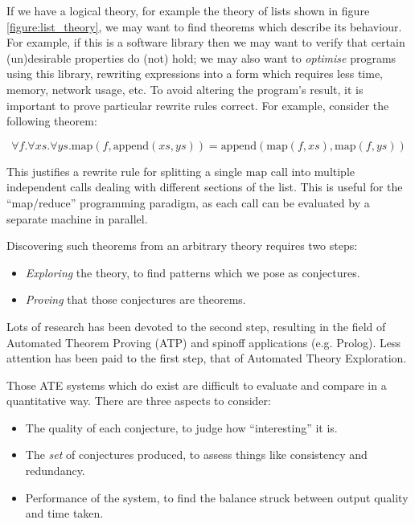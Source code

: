 If we have a logical theory, for example the theory of lists shown in figure
\ref{figure:list_theory}, we may want to find theorems which describe its
behaviour. For example, if this is a software library then we may want to verify
that certain (un)desirable properties do (not) hold; we may also want to
\emph{optimise} programs using this library, rewriting expressions into a form
which requires less time, memory, network usage, etc. To avoid altering the
program's result, it is important to prove particular rewrite rules correct. For
example, consider the following theorem:

\begin{equation} \label{eq:mapreduce}
  \forall f. \forall xs. \forall ys. \text{map}(f, \text{append}(xs, ys)) = \text{append}(\text{map}(f, xs), \text{map}(f, ys))
\end{equation}

This justifies a rewrite rule for splitting a single $\text{map}$ call into
multiple independent calls dealing with different sections of the list. This is
useful for the ``map/reduce'' programming paradigm, as each call can be
evaluated by a separate machine in parallel.

Discovering such theorems from an arbitrary theory requires two steps:

\begin{itemize}
\item \emph{Exploring} the theory, to find patterns which we pose as
  conjectures.
\item \emph{Proving} that those conjectures are theorems.
\end{itemize}

Lots of research has been devoted to the second step, resulting in the field of
Automated Theorem Proving (ATP) and spinoff applications (e.g. Prolog). Less
attention has been paid to the first step, that of Automated Theory Exploration.

Those ATE systems which do exist are difficult to evaluate and compare in a
quantitative way. There are three aspects to consider:

\begin{itemize}
\item The quality of each conjecture, to judge how ``interesting'' it is.
\item The \emph{set} of conjectures produced, to assess things like consistency
  and redundancy.
\item Performance of the system, to find the balance struck between output
  quality and time taken.
\end{itemize}

